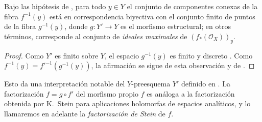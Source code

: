 \begin{corollary}[4.3.3]
\label{III.4.3.3}
\label{III.4.3.3-fr}
Bajo las hipótesis de , para todo $y\in Y$ el conjunto
de componentes conexas de la fibra $f^{-1}(y)$ está en correspondencia
biyectiva con el conjunto finito de puntos de la fibra
$g^{-1}(y)$, donde $g:Y'\to Y$ es el morfismo estructural; en otros
términos, corresponde al conjunto de \emph{ideales maximales} de
$(f_*(\mathcal O_X))_y$.
\end{corollary}

\begin{proof}
Como $Y'$ es finito sobre $Y$, el espacio $g^{-1}(y)$ es finito y
discreto . Como
$f^{-1}(y)=f'^{-1}(g^{-1}(y))$,
la afirmación se sigue de esta observación y de
.
\end{proof}

Esto da una interpretación notable del $Y$-preesquema $Y'$ definido en
. La factorización
$f=g\circ f'$ del morfismo propio $f$ es análoga a la factorización
obtenida por K.~Stein para aplicaciones holomorfas de espacios
analíticos, y lo llamaremos en adelante la \emph{factorización de Stein}
de $f$.

